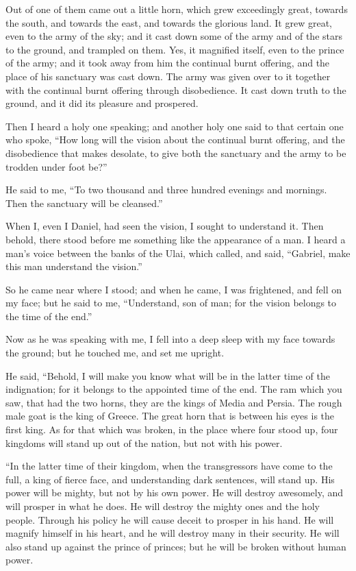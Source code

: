  Out of one of them came out a little horn, which grew
exceedingly great, towards the south, and towards the east, and towards
the glorious land.  It grew great, even to the army of the
sky; and it cast down some of the army and of the stars to the ground,
and trampled on them.  Yes, it magnified itself, even to
the prince of the army; and it took away from him the continual burnt
offering, and the place of his sanctuary was cast down. 
The army was given over to it together with the continual burnt offering
through disobedience. It cast down truth to the ground, and it did its
pleasure and prospered.

 Then I heard a holy one speaking; and another holy one
said to that certain one who spoke, ``How long will the vision about the
continual burnt offering, and the disobedience that makes desolate, to
give both the sanctuary and the army to be trodden under foot be?''

 He said to me, ``To two thousand and three hundred
evenings and mornings. Then the sanctuary will be cleansed.''

 When I, even I Daniel, had seen the vision, I sought to
understand it. Then behold, there stood before me something like the
appearance of a man.  I heard a man's voice between the
banks of the Ulai, which called, and said, ``Gabriel, make this man
understand the vision.''

 So he came near where I stood; and when he came, I was
frightened, and fell on my face; but he said to me, ``Understand, son of
man; for the vision belongs to the time of the end.''

 Now as he was speaking with me, I fell into a deep sleep
with my face towards the ground; but he touched me, and set me upright.

 He said, ``Behold, I will make you know what will be in
the latter time of the indignation; for it belongs to the appointed time
of the end.  The ram which you saw, that had the two horns,
they are the kings of Media and Persia.  The rough male
goat is the king of Greece. The great horn that is between his eyes is
the first king.  As for that which was broken, in the place
where four stood up, four kingdoms will stand up out of the nation, but
not with his power.

 ``In the latter time of their kingdom, when the
transgressors have come to the full, a king of fierce face, and
understanding dark sentences, will stand up.  His power
will be mighty, but not by his own power. He will destroy awesomely, and
will prosper in what he does. He will destroy the mighty ones and the
holy people.  Through his policy he will cause deceit to
prosper in his hand. He will magnify himself in his heart, and he will
destroy many in their security. He will also stand up against the prince
of princes; but he will be broken without human power.


